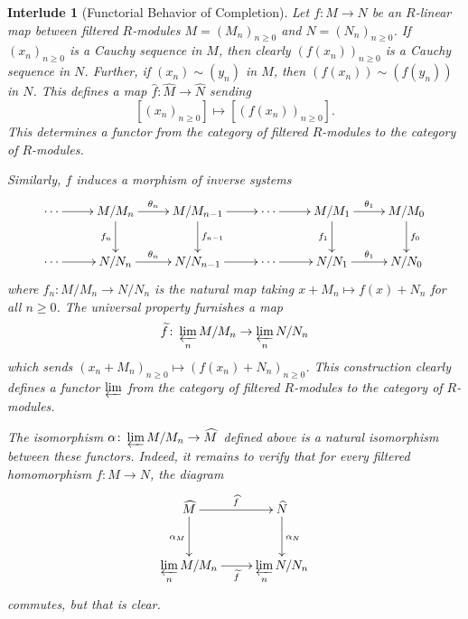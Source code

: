 \documentclass[11pt]{article}
\theoremstyle{thmstyle}
\theoremstyle{defstyle}
\newtheorem{interlude}[theorem]{Interlude}
\newcommand{\wt}[1]{\widetilde{#1}}
\newcommand{\wh}[1]{\widehat{#1}}
\renewcommand{\ge}{\geqslant}
\begin{document}
\begin{interlude}[Functorial Behavior of Completion]
    Let $f\colon M\to N$ be an $R$-linear map between filtered $R$-modules $M = (M_n)_{n\ge 0}$ and $N = (N_n)_{n\ge 0}$. If $(x_n)_{n\ge 0}$ is a Cauchy sequence in $M$, then clearly $\left(f(x_n)\right)_{n\ge 0}$ is a Cauchy sequence in $N$. Further, if $(x_n)\sim (y_n)$ in $M$, then $(f(x_n))\sim (f(y_n))$ in $N$. This defines a map $\wh f\colon\wh M\to\wh N$ sending 
    \begin{equation*}
        \left[(x_n)_{n\ge 0}\right]\longmapsto\left[(f(x_n))_{n\ge 0}\right].
    \end{equation*}
    This determines a functor from the category of filtered $R$-modules to the category of $R$-modules.

    Similarly, $f$ induces a morphism of inverse systems 
    \begin{equation*}
        \xymatrix {
            \cdots\ar[r] & M/M_{n}\ar[r]^-{\theta_n}\ar[d]_{f_n} & M/M_{n - 1}\ar[r]\ar[d]^{f_{n - 1}} & \cdots\ar[r] & M/M_1\ar[r]^-{\theta_1}\ar[d]_{f_1} & M/M_0\ar[d]^{f_0}\\
            \cdots\ar[r] & N/N_{n}\ar[r]^-{\theta_n} & N/N_{n - 1}\ar[r] & \cdots\ar[r] & N/N_1\ar[r]^-{\theta_1} & N/N_0
        }
    \end{equation*}
    where $f_n\colon M/M_n\to N/N_n$ is the natural map taking $x + M_n\mapsto f(x) + N_n$ for all $n\ge 0$. The universal property furnishes a map 
    \begin{equation*}
        \wt f\colon \varprojlim_n M/M_n\to\varprojlim_n N/N_n
    \end{equation*}
    which sends $(x_n + M_n)_{n\ge 0}\longmapsto (f(x_n) + N_n)_{n\ge 0}$. This construction clearly defines a functor $\varprojlim$ from the category of filtered $R$-modules to the category of $R$-modules.

    The isomorphism $\alpha\colon\varprojlim M/M_n\to\wh M$ defined above is a natural isomorphism between these functors. Indeed, it remains to verify that for every filtered homomorphism $f\colon M\to N$, the diagram 
    \begin{equation*}
        \xymatrix {
            \wh M\ar[r]^-{\wh f}\ar[d]_{\alpha_M} & \wh N\ar[d]^{\alpha_N}\\
            \displaystyle\varprojlim_n M/M_n\ar[r]_-{\wt f} & \displaystyle\varprojlim_n N/N_n
        }
    \end{equation*}
    commutes, but that is clear. 
\end{interlude}
\end{document}
